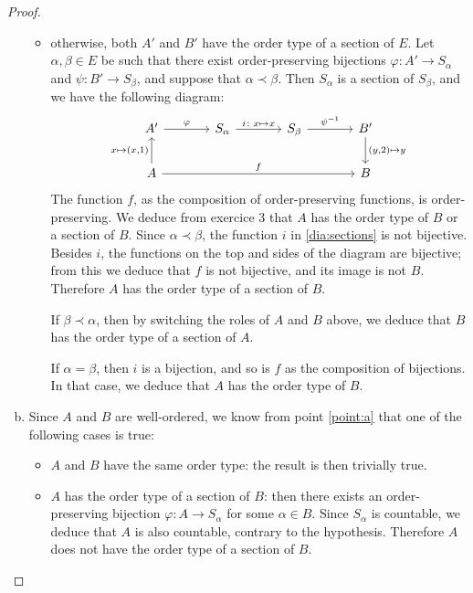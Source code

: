 \documentclass[11pt,a4paper,twoside]{article}
\theoremstyle{definition}
\begin{document}
\begin{proof}
\begin{enumerate}[(a)]
\begin{itemize}
      \item otherwise, both $A'$ and $B'$ have the order type of a section of $E$. Let $\alpha, \beta \in E$ be such that
        there exist order-preserving bijections $\varphi : A' \to S_\alpha$ and $\psi : B' \to S_\beta$, and suppose that $\alpha \prec \beta$.
        Then $S_\alpha$ is a section of $S_\beta$, and we have the following diagram:
        \begin{equation}\label{dia:sections}
          \begin{tikzcd}[column sep = large]
            A'
               \arrow{r}{\varphi}
            & S_\alpha
               \arrow{r}{i \colon x \mapsto x}
            & S_\beta
               \arrow{r}{\psi^{-1}}
            & B'
               \arrow{d}{( y, 2 ) \mapsto y} \\
            A
               \arrow{u}{x \mapsto ( x, 1 )}
               \arrow[to = 2-4, "f"]
            & & & B
          \end{tikzcd}
        \end{equation}
        The function $f$, as the composition of order-preserving functions, is order-preserving. We deduce from exercice 3
        that $A$ has the order type of $B$ or a section of $B$. Since $\alpha \prec \beta$, the function $i$ in \eqref{dia:sections}
        is not bijective. Besides $i$, the functions on the top and sides of the diagram are bijective; from this we deduce that
        $f$ is not bijective, and its image is not $B$. Therefore $A$ has the order type of a section of $B$.

        If $\beta \prec \alpha$, then by switching the roles of $A$ and $B$ above, we deduce that $B$ has the order type of
        a section of $A$.

        If $\alpha = \beta$, then $i$ is a bijection, and so is $f$ as the composition of bijections. In that case, we deduce
        that $A$ has the order type of $B$.

      \end{itemize}

      \item Since $A$ and $B$ are well-ordered, we know from point \ref{point:a} that one of the following cases is true:
        \begin{itemize}

          \item $A$ and $B$ have the same order type: the result is then trivially true.

          \item $A$ has the order type of a section of $B$: then there exists an order-preserving bijection $\varphi \colon A \to S_\alpha$
            for some $\alpha \in B$. Since $S_\alpha$ is countable, we deduce that $A$ is also countable, contrary to the hypothesis.
            Therefore $A$ does not have the order type of a section of $B$.


\end{itemize}
\end{enumerate}
\end{proof}
\end{document}
